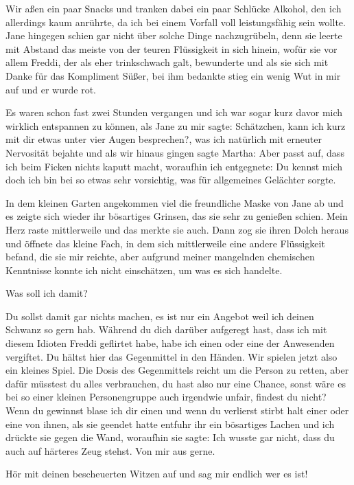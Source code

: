 \documentclass[11pt, a5paper]{article}
\newcommand{\te}{Jane } %
\newcommand{\Gf}{Martha}
\newcommand{\fr}{Freddi } %
\newcommand{\Fr}{Freddi}
\begin{document}
\begin{spacing}{1.2}
		Wir aßen ein paar Snacks und tranken dabei ein paar Schlücke Alkohol, den ich allerdings kaum anrührte, da ich bei einem Vorfall voll leistungsfähig sein wollte. \te hingegen schien gar nicht über solche Dinge nachzugrübeln, denn sie leerte mit Abstand das meiste von der teuren Flüssigkeit in sich hinein, wofür sie vor allem \Fr, der als eher trinkschwach galt, bewunderte und als sie sich mit \frqq Danke für das Kompliment Süßer\flqq , bei ihm bedankte stieg ein wenig Wut in mir auf und er wurde rot.
		
		Es waren schon fast zwei Stunden vergangen und ich war sogar kurz davor mich wirklich entspannen zu können, als \te zu mir sagte: \frqq Schätzchen, kann ich kurz mit dir etwas unter vier Augen besprechen?\flqq , was ich natürlich mit erneuter Nervosität bejahte und als wir hinaus gingen sagte \Gf : \frqq Aber passt auf, dass ich beim Ficken nichts kaputt macht\flqq , woraufhin ich entgegnete: \frqq Du kennst mich doch ich bin bei so etwas sehr vorsichtig\flqq , was für allgemeines Gelächter sorgte.
		
		In dem kleinen Garten angekommen viel die freundliche Maske von \te ab und es zeigte sich wieder ihr bösartiges Grinsen, das sie sehr zu genießen schien. Mein Herz raste mittlerweile und das merkte sie auch. Dann zog sie ihren Dolch heraus und öffnete das kleine Fach, in dem sich mittlerweile eine andere Flüssigkeit befand, die sie mir reichte, aber aufgrund meiner mangelnden chemischen Kenntnisse konnte ich nicht einschätzen, um was es sich handelte.
		
		\frqq Was soll ich damit?\flqq
		
		\frqq Du sollst damit gar nichts machen, es ist nur ein Angebot weil ich deinen Schwanz so gern hab. Während du dich darüber aufgeregt hast, dass ich mit diesem Idioten \fr geflirtet habe, habe ich einen oder eine der Anwesenden vergiftet. Du hältst hier das Gegenmittel in den Händen. Wir spielen jetzt also ein kleines Spiel. Die Dosis des Gegenmittels reicht um die Person zu retten, aber dafür müsstest du alles verbrauchen, du hast also nur eine Chance, sonst wäre es bei so einer kleinen Personengruppe auch irgendwie unfair, findest du nicht? Wenn du gewinnst blase ich dir einen und wenn du verlierst stirbt halt einer oder eine von ihnen\flqq , als sie geendet hatte entfuhr ihr ein bösartiges Lachen und ich drückte sie gegen die Wand, woraufhin sie sagte: \frqq Ich wusste gar nicht, dass du auch auf härteres Zeug stehst. Von mir aus gerne.\flqq
		
		\frqq Hör mit deinen bescheuerten Witzen auf und sag mir endlich wer es ist!\flqq
		

\end{spacing}
\end{document}
